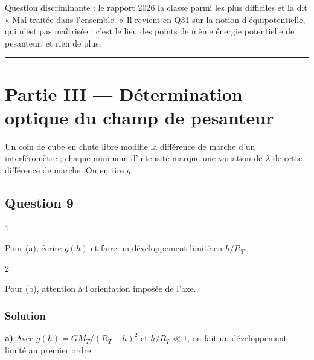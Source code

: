 \documentclass[11pt,a4paper]{article}
\begin{document}
\begin{jury}

Question discriminante : le rapport 2026 la classe parmi les plus difficiles et la dit « Mal traitée dans l'ensemble. » Il revient en Q31 sur la notion d'équipotentielle, qui n'est pas maîtrisée : c'est le lieu des points de même énergie potentielle de pesanteur, et rien de plus.

\end{jury}

\begin{center}\rule{0.5\linewidth}{0.5pt}\end{center}

\hypertarget{partie-iii-duxe9termination-optique-du-champ-de-pesanteur}{%
\section{Partie III --- Détermination optique du champ de pesanteur}\label{partie-iii-duxe9termination-optique-du-champ-de-pesanteur}}

Un coin de cube en chute libre modifie la différence de marche d'un interféromètre ; chaque minimum d'intensité marque une variation de \(\lambda\) de cette différence de marche. On en tire \(g\).

\hypertarget{question-9}{%
\subsection{Question 9}\label{question-9}}

\begin{indication}{1}

Pour (a), écrire \(g(h)\) et faire un développement limité en \(h/R_T\).

\end{indication}

\begin{indication}{2}

Pour (b), attention à l'orientation imposée de l'axe.

\end{indication}

\hypertarget{solution-8}{%
\subsubsection{Solution}\label{solution-8}}

\textbf{a)} Avec \(g(h)=GM_T/(R_T+h)^2\) et \(h/R_T\ll1\), on fait un développement limité au premier ordre :
\end{document}
